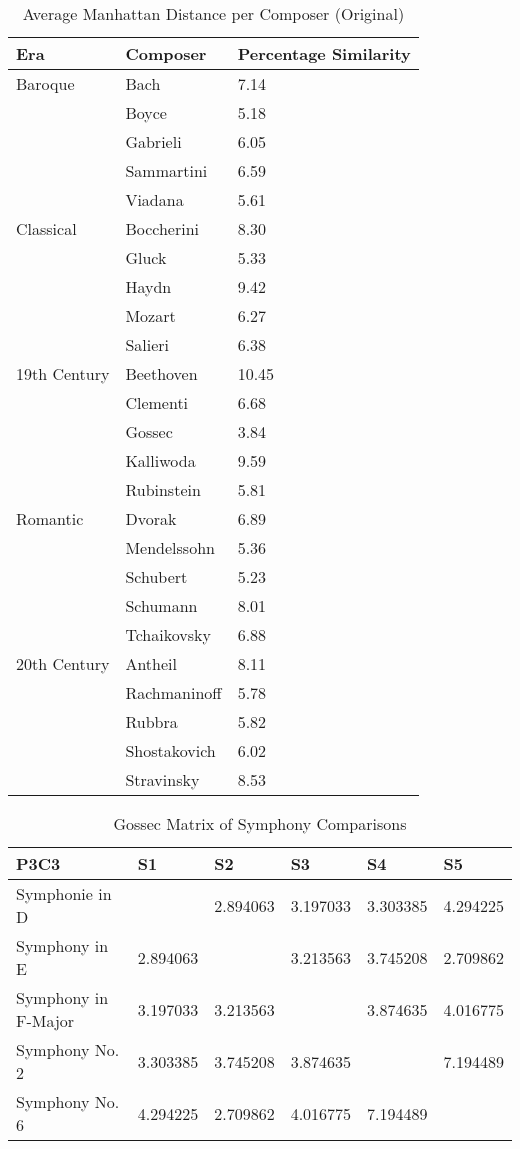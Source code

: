 \begin{longtable}{|l|l|l|}
\caption{Average Manhattan Distance per Composer (Original)}
\label{my-label}\\
\hline
Era & Composer & Percentage Similarity \\ \hline
\endfirsthead
%
\endhead
%
Baroque & Bach & 7.14 \\ \hline
 & Boyce & 5.18 \\ \hline
 & Gabrieli & 6.05 \\ \hline
 & Sammartini & 6.59 \\ \hline
 & Viadana & 5.61 \\ \hline
Classical & Boccherini & 8.30 \\ \hline
 & Gluck & 5.33 \\ \hline
 & Haydn & 9.42 \\ \hline
 & Mozart & 6.27 \\ \hline
 & Salieri & 6.38 \\ \hline
19th Century & Beethoven & 10.45 \\ \hline
 & Clementi & 6.68 \\ \hline
 & Gossec & 3.84 \\ \hline
 & Kalliwoda & 9.59 \\ \hline
 & Rubinstein & 5.81 \\ \hline
Romantic & Dvorak & 6.89 \\ \hline
 & Mendelssohn & 5.36 \\ \hline
 & Schubert & 5.23 \\ \hline
 & Schumann & 8.01 \\ \hline
 & Tchaikovsky & 6.88 \\ \hline
20th Century & Antheil & 8.11 \\ \hline
 & Rachmaninoff & 5.78 \\ \hline
 & Rubbra & 5.82 \\ \hline
 & Shostakovich & 6.02 \\ \hline
 & Stravinsky & 8.53 \\ \hline
\end{longtable}

\begin{longtable}{|l|l|l|l|l|l|}
\caption{Gossec Matrix of Symphony Comparisons}
\label{my-label}\\
\hline
P3C3 & S1 & S2 & S3 & S4 & S5 \\ \hline
\endfirsthead
%
\endhead
%
Symphonie in D &  & 2.894063 & 3.197033 & 3.303385 & 4.294225 \\ \hline
Symphony in E & 2.894063 &  & 3.213563 & 3.745208 & 2.709862 \\ \hline
Symphony in F-Major & 3.197033 & 3.213563 &  & 3.874635 & 4.016775 \\ \hline
Symphony No. 2 & 3.303385 & 3.745208 & 3.874635 &  & 7.194489 \\ \hline
Symphony No. 6 & 4.294225 & 2.709862 & 4.016775 & 7.194489 &  \\ \hline
\end{longtable}

